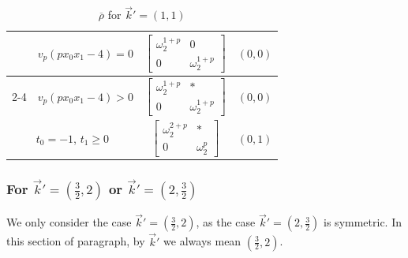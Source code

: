 \documentclass[11pt]{amsart}
\theoremstyle{definition}
\numberwithin{equation}{subsection}
\theoremstyle{plain}
\theoremstyle{plain}
\theoremstyle{plain}
\theoremstyle{plain}
\theoremstyle{plain}
\theoremstyle{plain}
\theoremstyle{plain}
\theoremstyle{plain}
\theoremstyle{plain}
\theoremstyle{plain}
\theoremstyle{plain}
\theoremstyle{plain}
\theoremstyle{definition}
\theoremstyle{definition}
\theoremstyle{definition}
\theoremstyle{remark}
\renewcommand{\(}{\textup{(}}
\renewcommand{\)}{\textup{)}}
\newcommand{\rhobar}{\overline{\rho}}
\newcommand{\vk}{\vec{k}}
\begin{document}
\begin{small}
\begin{table}[htbp]
\begin{tabular}{|c|c||c|c|}
        & $v_p(px_0x_1-4)=0$
        & $
        \begin{bmatrix}
            \omega_2^{1+p} & 0 \\ 0 & \omega_2^{1+p}
        \end{bmatrix}$
        & $(0,0)$ \\\cline{2-4}
        & $v_p(px_0x_1-4)>0$
        & $
        \begin{bmatrix}
            \omega_2^{1+p} & * \\ 0 & \omega_2^{1+p}
        \end{bmatrix}$
        & $(0,0)$ \\\hline
    \multicolumn{2}{|c||}{$t_0=-1$, $t_1\geq 0$}
        & $
        \begin{bmatrix}
          \omega_2^{2+p} & * \\
          0 & \omega_2^p
        \end{bmatrix}$ & $(0,1)$ \\\hline
  \end{tabular}
  \caption{$\rhobar$ for $\vk'=(1,1)$}\label{tab: (1,1)}
\end{table}
\end{small}

\subsubsection{\textbf{For $\vk'=(\frac{3}{2},2)$ or $\vk'=(2,\frac{3}{2})$}}\label{subsubsec: vr=(2,2), vk=(3/2,2),(2,3/2)}
We only consider the case $\vk'=(\tfrac{3}{2},2)$, as the case $\vk'=(2,\frac{3}{2})$ is symmetric. In this section of paragraph, by $\vk'$ we always mean $(\frac{3}{2},2)$.
\end{document}
